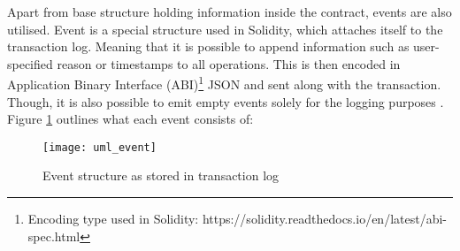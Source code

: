 Apart from base structure holding information inside the contract, events are also utilised. Event is a special structure used in Solidity, which attaches itself to the transaction log. Meaning that it is possible to append information such as user-specified reason or timestamps to all operations. This is then encoded in Application Binary Interface (ABI)\footnote{Encoding type used in Solidity: https://solidity.readthedocs.io/en/latest/abi-spec.html} JSON and sent along with the transaction. Though, it is also possible to emit empty events solely for the logging purposes \citep{dannen2017introducing}.  Figure \ref{fig:uml_event} outlines what each event consists of:
\begin{figure}[h]
    \centering
    \texttt{[image: uml\_event]}
    \caption{Event structure as stored in transaction log}
    \label{fig:uml_event}
\end{figure}

